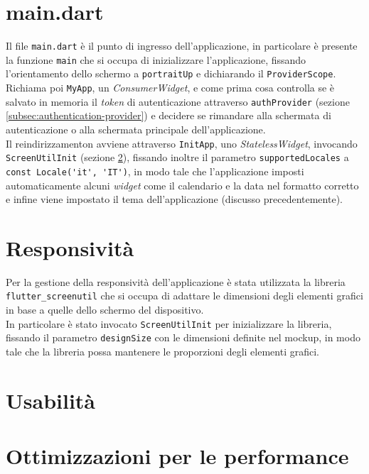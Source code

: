 \section{main.dart}
\label{sec:main}

Il file \lstinline{main.dart} è il punto di ingresso dell'applicazione, in particolare è presente la funzione \lstinline{main} che si occupa di inizializzare l'applicazione, fissando l'orientamento dello schermo a \lstinline{portraitUp} e dichiarando il \lstinline{ProviderScope}. \\
Richiama poi \lstinline{MyApp}, un \emph{ConsumerWidget}, e come prima cosa controlla se è salvato in memoria il \emph{token} di autenticazione attraverso \lstinline{authProvider} (sezione \ref{subsec:authentication-provider}) e decidere se rimandare alla schermata di autenticazione o alla schermata principale dell'applicazione. \\
Il reindirizzamenton avviene attraverso \lstinline{InitApp}, uno \emph{StatelessWidget}, invocando \lstinline{ScreenUtilInit} (sezione \ref{sec:responsivity}), fissando inoltre il parametro \lstinline{supportedLocales} a \lstinline{const Locale('it', 'IT')}, in modo tale che l'applicazione imposti automaticamente alcuni \emph{widget} come il calendario e la data nel formatto corretto e infine viene impostato il tema dell'applicazione (discusso precedentemente).

\section{Responsività}
\label{sec:responsivity}

Per la gestione della responsività dell'applicazione è stata utilizzata la libreria \lstinline{flutter_screenutil}\cite{site:screenutil} che si occupa di adattare le dimensioni degli elementi grafici in base a quelle dello schermo del dispositivo. \\
In particolare è stato invocato \lstinline{ScreenUtilInit} per inizializzare la libreria, fissando il parametro \lstinline{designSize} con le dimensioni definite nel \gls{mockup}\glsoccur, in modo tale che la libreria possa mantenere le proporzioni degli elementi grafici. 

\section{Usabilità}
\label{sec:usability}


\section{Ottimizzazioni per le performance}
\label{sec:performance}




